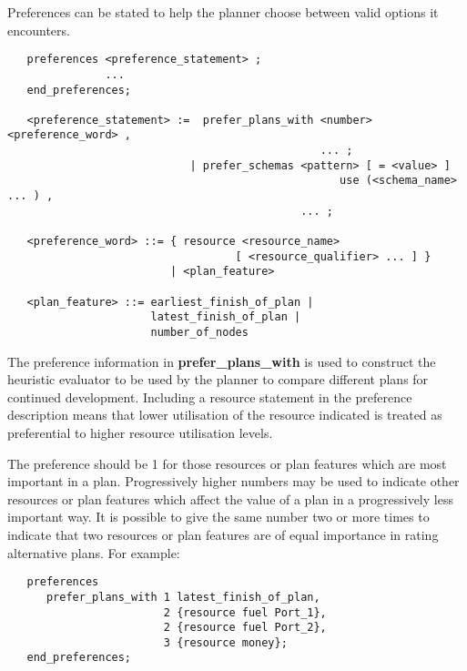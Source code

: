 Preferences can be stated to help the planner choose between valid
options it encounters.

\begin{verbatim}
   preferences <preference_statement> ;
               ...
   end_preferences;

   <preference_statement> :=  prefer_plans_with <number> <preference_word> ,
                                                ... ;
                            | prefer_schemas <pattern> [ = <value> ]
                                                   use (<schema_name> ... ) ,
                                             ... ;

   <preference_word> ::= { resource <resource_name>
                                   [ <resource_qualifier> ... ] }
                         | <plan_feature>

   <plan_feature> ::= earliest_finish_of_plan |
                      latest_finish_of_plan | 
                      number_of_nodes
\end{verbatim}

The preference information in {\bf prefer\_plans\_with} is used to construct
the heuristic evaluator to be used by the planner to compare different plans
for continued development.  Including a resource statement in the preference
description means that lower utilisation of the resource indicated is
treated as preferential to higher resource utilisation levels.

The preference  should be 1 for those resources or plan features
which are most important in a plan.  Progressively higher numbers may be used
to indicate other resources or plan features which affect the value of a plan
in a progressively less important way.  It is possible to give the same number
two or more times to indicate that two resources or plan features are of equal
importance in rating alternative plans.  For example:

\begin{verbatim}
   preferences
      prefer_plans_with 1 latest_finish_of_plan,
                        2 {resource fuel Port_1},
                        2 {resource fuel Port_2},
                        3 {resource money};
   end_preferences;
\end{verbatim}

